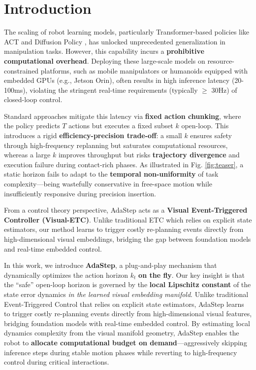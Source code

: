 \documentclass[conference]{IEEEtran}
\begin{document}
\section{Introduction}

The scaling of robot learning models, particularly Transformer-based policies like ACT \cite{zhao2023learning} and Diffusion Policy \cite{chi2023diffusion}, has unlocked unprecedented generalization in manipulation tasks. However, this capability incurs a \textbf{prohibitive computational overhead}. Deploying these large-scale models on resource-constrained platforms, such as mobile manipulators or humanoids equipped with embedded GPUs (e.g., Jetson Orin), often results in high inference latency (20-100ms), violating the stringent real-time requirements (typically $\ge$ 30Hz) of closed-loop control.

Standard approaches mitigate this latency via \textbf{fixed action chunking}, where the policy predicts $T$ actions but executes a fixed subset $k$ open-loop. This introduces a rigid \textbf{efficiency-precision trade-off}: a small $k$ ensures safety through high-frequency replanning but saturates computational resources, whereas a large $k$ improves throughput but risks \textbf{trajectory divergence} and execution failure during contact-rich phases. As illustrated in Fig. \ref{fig:teaser}, a static horizon fails to adapt to the \textbf{temporal non-uniformity} of task complexity---being wastefully conservative in free-space motion while insufficiently responsive during precision insertion.

From a control theory perspective, AdaStep acts as a \textbf{Visual Event-Triggered Controller (Visual-ETC)}. Unlike traditional ETC which relies on explicit state estimators, our method learns to trigger costly re-planning events directly from high-dimensional visual embeddings, bridging the gap between foundation models and real-time embedded control.

In this work, we introduce \textbf{AdaStep}, a plug-and-play mechanism that dynamically optimizes the action horizon $k_t$ \textbf{on the fly}. Our key insight is that the ``safe'' open-loop horizon is governed by the \textbf{local Lipschitz constant} of the state error dynamics \emph{in the learned visual embedding manifold}. Unlike traditional Event-Triggered Control that relies on explicit state estimators, AdaStep learns to trigger costly re-planning events directly from high-dimensional visual features, bridging foundation models with real-time embedded control. By estimating local dynamics complexity from the visual manifold geometry, AdaStep enables the robot to \textbf{allocate computational budget on demand}---aggressively skipping inference steps during stable motion phases while reverting to high-frequency control during critical interactions.
\end{document}

